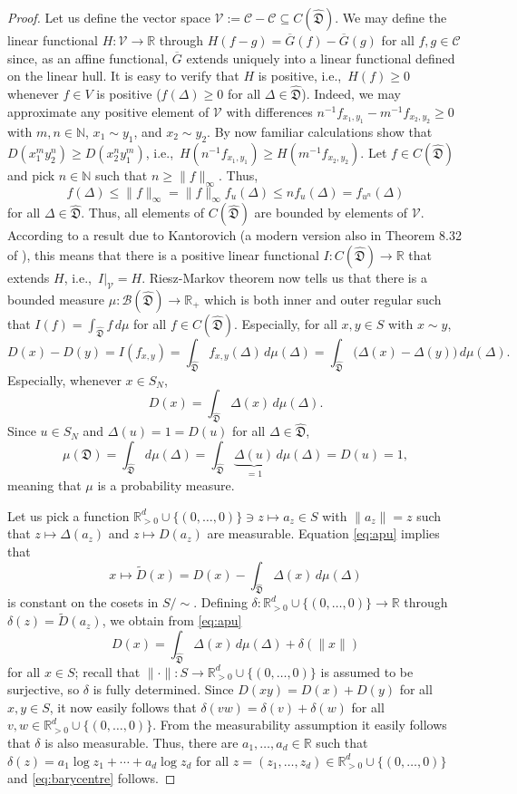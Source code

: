 \documentclass[12pt,a4paper,reqno]{amsart}
\theoremstyle{definition}
\newcommand{\mc}[1]{\mathcal{#1}}
\newcommand{\mf}[1]{\mathfrak{#1}}
\newcommand{\N}{\mathbb N}
\newcommand{\R}{\mathbb R}
\begin{document}
\begin{proof}
Let us define the vector space $\mc V:=\mc C-\mc C\subseteq C(\hat{\mf D})$. We may define the linear functional $H:\mc V\to\R$ through $H(f-g)=\overline{G}(f)-\overline{G}(g)$ for all $f,g\in\mc C$ since, as an affine functional, $\overline{G}$ extends uniquely into a linear functional defined on the linear hull. It is easy to verify that $H$ is positive, i.e.,\ $H(f)\geq 0$ whenever $f\in V$ is positive ($f(\Delta)\geq0$ for all $\Delta\in\hat{\mf D}$). Indeed, we may approximate any positive element of $\mc V$ with differences $n^{-1}f_{x_1,y_1}-m^{-1}f_{x_2,y_2}\geq0$ with $m,n\in\N$, $x_1\sim y_1$, and $x_2\sim y_2$. By now familiar calculations show that $D(x_1^my_2^n)\geq D(x_2^ny_1^m)$, i.e.,\ $H(n^{-1}f_{x_1,y_1})\geq H(m^{-1}f_{x_2,y_2})$. Let $f\in C(\hat{\mf D})$ and pick $n\in\N$ such that $n\geq\|f\|_\infty$. Thus,
$$
f(\Delta)\leq\|f\|_\infty=\|f\|_\infty f_u(\Delta)\leq nf_u(\Delta)=f_{u^n}(\Delta)
$$
for all $\Delta\in\hat{\mf D}$. Thus, all elements of $C(\hat{\mf D})$ are bounded by elements of $\mc V$. According to a result due to Kantorovich \cite{Kantorovich} (a modern version also in Theorem 8.32 of \cite{InfDimAnalysis}), this means that there is a positive linear functional $I:C(\hat{\mf D})\to\R$ that extends $H$, i.e.,\ $I|_{\mc V}=H$. Riesz-Markov theorem now tells us that there is a bounded measure $\mu:\mc B(\hat{\mf D})\to\R_+$ which is both inner and outer regular such that $I(f)=\int_{\hat{\mf D}}f\,d\mu$ for all $f\in C(\hat{\mf D})$. Especially, for all $x, y\in S$ with $x\sim y$,
\begin{equation}\label{eq:apu}
D(x)-D(y)=I(f_{x,y})=\int_{\hat{\mf D}} f_{x,y}(\Delta)\,d\mu(\Delta)
=\int_{\hat{\mf D}}\big(\Delta(x)-\Delta(y)\big)\,d\mu(\Delta).
\end{equation}
Especially, whenever $x\in S_N$,
$$
D(x)=\int_{\hat{\mf D}}\Delta(x)\,d\mu(\Delta).
$$
Since $u\in S_N$ and $\Delta(u)=1=D(u)$ for all $\Delta\in\hat{\mf D}$,
$$
\mu(\mf D)=\int_{\hat{\mf D}}d\mu(\Delta)=\int_{\hat{\mf D}}\underbrace{\Delta(u)}_{=1}\,d\mu(\Delta)=D(u)=1,
$$
meaning that $\mu$ is a probability measure.

Let us pick a function $\R_{>0}^d\cup\{(0,\ldots,0)\}\ni z\mapsto a_z\in S$ with $\|a_z\|=z$ such that $z\mapsto\Delta(a_z)$ and $z\mapsto D(a_z)$ are measurable. Equation \eqref{eq:apu} implies that
$$
x\mapsto\tilde{D}(x)=D(x)-\int_{\hat{\mf D}}\Delta(x)\,d\mu(\Delta)
$$
is constant on the cosets in $S/\!\sim$. Defining $\delta:\R_{>0}^d\cup\{(0,\ldots,0)\}\to\R$ through $\delta(z)=\tilde{D}(a_z)$, we obtain from \eqref{eq:apu}
$$
D(x)=\int_{\hat{\mf D}}\Delta(x)\,d\mu(\Delta)+\delta(\|x\|)
$$
for all $x\in S$; recall that $\|\cdot\|:S\to\R_{>0}^d\cup\{(0,\ldots,0)\}$ is assumed to be surjective, so $\delta$ is fully determined. Since $D(xy)=D(x)+D(y)$ for all $x,y\in S$, it now easily follows that $\delta(vw)=\delta(v)+\delta(w)$ for all $v,w\in\R_{>0}^d\cup\{(0,\ldots,0)\}$. From the measurability assumption it easily follows that $\delta$ is also measurable. Thus, there are $a_1,\ldots,a_d\in\R$ such that $\delta(z)=a_1\log{z_1}+\cdots+a_d\log{z_d}$ for all $z=(z_1,\ldots,z_d)\in\R_{>0}^d\cup\{(0,\ldots,0)\}$ and \eqref{eq:barycentre} follows.
\end{proof}
\end{document}
